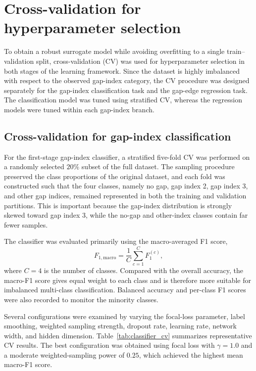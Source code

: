 \section{Cross-validation for hyperparameter selection}
\label{sec:cross_validation}

To obtain a robust surrogate model while avoiding overfitting to a single train--validation split, cross-validation (CV) was used for hyperparameter selection in both stages of the learning framework. Since the dataset is highly imbalanced with respect to the observed gap-index category, the CV procedure was designed separately for the gap-index classification task and the gap-edge regression task. The classification model was tuned using stratified CV, whereas the regression models were tuned within each gap-index branch.

\subsection{Cross-validation for gap-index classification}

For the first-stage gap-index classifier, a stratified five-fold CV was performed on a randomly selected $20\%$ subset of the full dataset. The sampling procedure preserved the class proportions of the original dataset, and each fold was constructed such that the four classes, namely no gap, gap index 2, gap index 3, and other gap indices, remained represented in both the training and validation partitions. This is important because the gap-index distribution is strongly skewed toward gap index 3, while the no-gap and other-index classes contain far fewer samples.

The classifier was evaluated primarily using the macro-averaged F1 score,
\begin{equation}
    F_{1,\mathrm{macro}}
    =
    \frac{1}{C}
    \sum_{c=1}^{C}
    F_{1}^{(c)},
\end{equation}
where $C=4$ is the number of classes. Compared with the overall accuracy, the macro-F1 score gives equal weight to each class and is therefore more suitable for imbalanced multi-class classification. Balanced accuracy and per-class F1 scores were also recorded to monitor the minority classes.

Several configurations were examined by varying the focal-loss parameter, label smoothing, weighted sampling strength, dropout rate, learning rate, network width, and hidden dimension. Table~\ref{tab:classifier_cv} summarizes representative CV results. The best configuration was obtained using focal loss with $\gamma=1.0$ and a moderate weighted-sampling power of $0.25$, which achieved the highest mean macro-F1 score.

